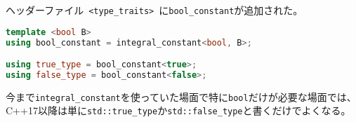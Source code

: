 %

ヘッダーファイル~\lstinline!<type_traits>!~に\lstinline!bool_constant!が追加された。

\begin{lstlisting}[language=C++]
template <bool B>
using bool_constant = integral_constant<bool, B>;

using true_type = bool_constant<true>;
using false_type = bool_constant<false>;
\end{lstlisting}

今まで\lstinline!integral_constant!を使っていた場面で特に\lstinline!bool!だけが必要な場面では、C++17以降は単に\lstinline!std::true_type!か\lstinline!std::false_type!と書くだけでよくなる。
